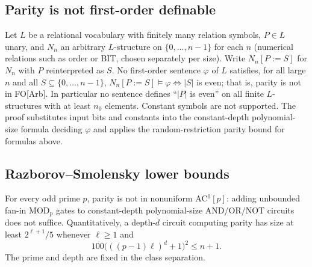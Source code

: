 \begin{result}
\subsection{Parity is not first-order definable}
Let $L$ be a relational vocabulary with finitely many relation symbols, $P\in L$ unary, and
$N_n$ an arbitrary $L$-structure on $\{0,\dots,n-1\}$ for each $n$ (numerical relations such as
order or BIT, chosen separately per size). Write $N_n[P{:=}S]$ for $N_n$ with $P$ reinterpreted
as $S$. No first-order sentence $\varphi$ of $L$ satisfies, for all large $n$ and all
$S\subseteq\{0,\dots,n-1\}$, $N_n[P{:=}S]\models\varphi\iff|S|$ is even; that is, parity is not
in FO[Arb]. In particular no sentence defines ``$|P|$ is even'' on all finite $L$-structures with
at least $n_0$ elements. Constant symbols are not supported. The proof substitutes input bits
and constants into the constant-depth polynomial-size formula deciding $\varphi$ and applies the
random-restriction parity bound for formulas above.\citep{FurstSaxeSipser1984,Ajtai1983,Immerman1999}
\end{result}


\begin{result}
\subsection{Razborov--Smolensky lower bounds}
For every odd prime $p$, parity is not in nonuniform AC$^0[p]$: adding unbounded
fan-in MOD$_p$ gates to constant-depth polynomial-size AND/OR/NOT circuits does
not suffice. Quantitatively, a depth-$d$ circuit computing parity has size at
least $2^{\ell+1}/5$ whenever $\ell\ge1$ and
\[
100\bigl(((p-1)\ell)^d+1\bigr)^2\le n+1.
\]
The prime and depth are fixed in the class separation.\citep{Razborov1987,Smolensky1987}
\end{result}

